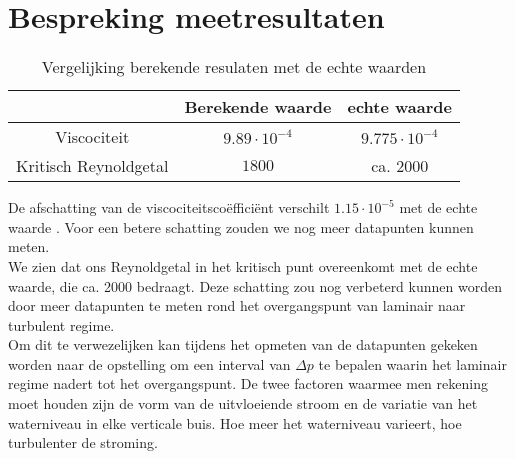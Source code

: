 \section{Bespreking meetresultaten}

\begin{table}[H]
    \centering
    \label{tab:vergelijking}
    \caption{Vergelijking berekende resulaten met de echte waarden}
    \begin{tabular}{| c | c | c |}
        \hline
                                & Berekende waarde      & echte waarde          \\ \hline
        Viscociteit             & $9.89 \cdot 10^{-4}$  & $9.775 \cdot 10^{-4}$ \\ \hline
        Kritisch Reynoldgetal   & $1800$                & ca. $2000$            \\ \hline
    \end{tabular}
\end{table}

De afschatting van de viscociteitsco\"effici\"ent verschilt $1.15 \cdot 10^{-5}$ met de echte waarde \cite{viscocity}.
Voor een betere schatting zouden we nog meer datapunten kunnen meten.
\\

We zien dat ons Reynoldgetal in het kritisch punt overeenkomt met de echte waarde, die ca. 2000 bedraagt. 
Deze schatting zou nog verbeterd kunnen worden door meer datapunten te meten rond het overgangspunt van 
laminair naar turbulent regime. \\

Om dit te verwezelijken kan tijdens het opmeten van de datapunten gekeken worden naar de opstelling om een
interval van $\Delta p$ te bepalen waarin het laminair regime nadert tot het overgangspunt. De twee factoren waarmee 
men rekening moet houden zijn de vorm van de uitvloeiende stroom en de variatie van het waterniveau in elke verticale buis.
Hoe meer het waterniveau varieert, hoe turbulenter de stroming.
